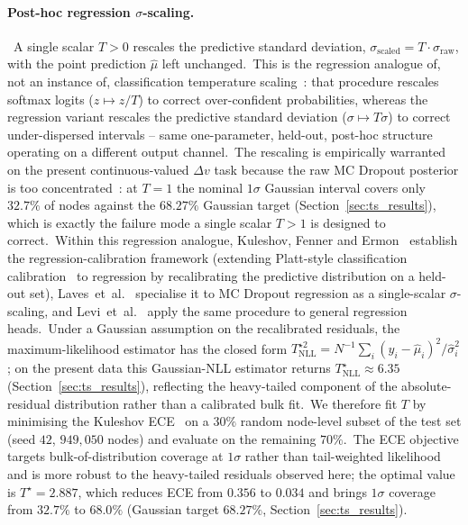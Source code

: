 \paragraph{Post-hoc regression $\sigma$-scaling.}\ A single scalar $T > 0$ rescales the predictive standard deviation, $\sigma_\text{scaled} = T \cdot \sigma_\text{raw}$, with the point prediction $\hat\mu$ left unchanged.\ This is the regression analogue of, not an instance of, classification temperature scaling~\cite{guo2017calibration}: that procedure rescales softmax logits ($z \mapsto z/T$) to correct over-confident probabilities, whereas the regression variant rescales the predictive standard deviation ($\sigma \mapsto T\sigma$) to correct under-dispersed intervals -- same one-parameter, held-out, post-hoc structure operating on a different output channel.\ The rescaling is empirically warranted on the present continuous-valued $\Delta v$ task because the raw MC Dropout posterior is too concentrated~\cite{foong2019between}: at $T = 1$ the nominal $1\sigma$ Gaussian interval covers only $32.7\%$ of nodes against the $68.27\%$ Gaussian target (Section~\ref{sec:ts_results}), which is exactly the failure mode a single scalar $T > 1$ is designed to correct.\ Within this regression analogue, Kuleshov, Fenner and Ermon~\cite{kuleshov2018accurate} establish the regression-calibration framework (extending Platt-style classification calibration~\cite{guo2017calibration} to regression by recalibrating the predictive distribution on a held-out set), Laves~et~al.~\cite{laves2020wellcal,laves2019temperature} specialise it to MC Dropout regression as a single-scalar $\sigma$-scaling, and Levi~et~al.~\cite{levi2022evaluating} apply the same procedure to general regression heads.\ Under a Gaussian assumption on the recalibrated residuals, the maximum-likelihood estimator has the closed form $T^{\star 2}_\text{NLL} = N^{-1}\sum_i (y_i - \hat\mu_i)^2 / \hat\sigma_i^2$; on the present data this Gaussian-NLL estimator returns $T^\star_\text{NLL} \approx 6.35$ (Section~\ref{sec:ts_results}), reflecting the heavy-tailed component of the absolute-residual distribution rather than a calibrated bulk fit.\ We therefore fit $T$ by minimising the Kuleshov ECE~\cite{kuleshov2018accurate} on a $30\%$ random node-level subset of the test set (seed $42$, $949{,}050$ nodes) and evaluate on the remaining $70\%$.\ The ECE objective targets bulk-of-distribution coverage at $1\sigma$ rather than tail-weighted likelihood and is more robust to the heavy-tailed residuals observed here; the optimal value is $T^\star = 2.887$, which reduces ECE from $0.356$ to $0.034$ and brings $1\sigma$ coverage from $32.7\%$ to $68.0\%$ (Gaussian target $68.27\%$, Section~\ref{sec:ts_results}).

